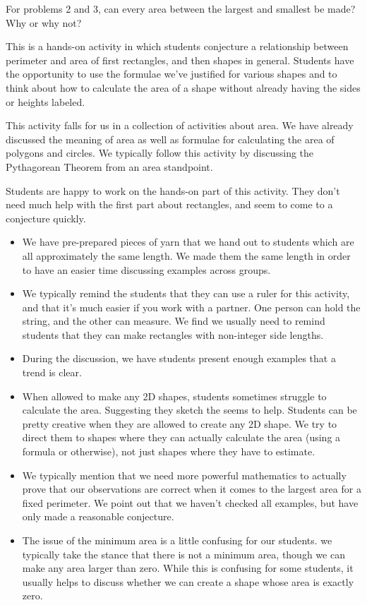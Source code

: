\documentclass{ximera}
\begin{document}
\begin{problem} For problems 2 and 3, can every area between the largest and smallest be made?  Why or why not?

\end{problem}

\newpage
\begin{instructorNotes}
This is a hands-on activity in which students conjecture a relationship between perimeter and area of first rectangles, and then shapes in general.  Students have the opportunity to use the formulae we've justified for various shapes and to think about how to calculate the area of a shape without already having the sides or heights labeled.

This activity falls for us in a collection of activities about area.  We have already discussed the meaning of area as well as formulae for calculating the area of polygons and circles.  We typically follow this activity by discussing the Pythagorean Theorem from an area standpoint.

Students are happy to work on the hands-on part of this activity.  They don't need much help with the first part about rectangles, and seem to come to a conjecture quickly.
\begin{itemize}
    \item We have pre-prepared pieces of yarn that we hand out to students which are all approximately the same length.  We made them the same length in order to have an easier time discussing examples across groups.
    \item We typically remind the students that they can use a ruler for this activity, and that it's much easier if you work with a partner.  One person can hold the string, and the other can measure.  We find we usually need to remind students that they can make rectangles with non-integer side lengths.
	\item During the discussion, we have students present enough examples that a trend is clear.  
    \item 	When allowed to make any 2D shapes, students sometimes struggle to calculate the area.  Suggesting they sketch the seems to help.  Students can be pretty creative when they are allowed to create any 2D shape.  We try to direct them to shapes where they can actually calculate the area (using a formula or otherwise), not just shapes where they have to estimate.
	\item We typically mention that we need more powerful mathematics to actually prove that our observations are correct when it comes to the largest area for a fixed perimeter.  We point out that we haven't checked all examples, but have only made a reasonable conjecture.
	\item The issue of the minimum area is a little confusing for our students.  we typically take the stance that there is not a minimum area, though we can make any area larger than zero.  While this is confusing for some students, it usually helps to discuss whether we can create a shape whose area is exactly zero.
\end{itemize}








\end{instructorNotes}
\end{document}
